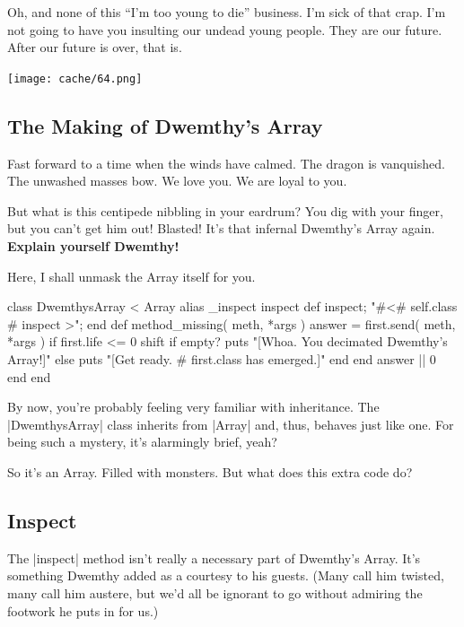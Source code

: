 \documentclass[12pt,twoside]{report}
\begin{document}
Oh, and none of this ``I'm too young to die'' business.  I'm sick of
that crap. I'm not going to have you insulting our undead young
people.  They are our future. After our future is over, that is.

	\texttt{[image: cache/64.png]}



\subsection{The Making of Dwemthy's Array}



Fast forward to a time when the winds have calmed.  The dragon is
vanquished.  The unwashed masses bow.  We love you. We are loyal to
you.

But what is this centipede nibbling in your eardrum?  You dig with
your finger, but you can't get him out!  Blasted!  It's that infernal
Dwemthy's Array again.  {\bf Explain yourself Dwemthy!}

Here, I shall unmask the Array itself for you.


\begin{rubycode}

 class DwemthysArray < Array
   alias _inspect inspect
   def inspect; "#<#{ self.class }#{ inspect }>"; end
   def method_missing( meth, *args )
     answer = first.send( meth, *args )
     if first.life <= 0
       shift
       if empty?
         puts "[Whoa.  You decimated Dwemthy's Array!]"
       else
         puts "[Get ready. #{ first.class } has emerged.]"
       end
     end
     answer || 0
   end
 end

\end{rubycode}


By now, you're probably feeling very familiar with inheritance.  The
\rubyinline|DwemthysArray| class inherits from
\rubyinline|Array| and, thus, behaves just like one.
For being such a mystery, it's alarmingly brief, yeah?

So it's an Array.  Filled with monsters.  But what does this extra
code do?



\subsection{Inspect}



The \rubyinline|inspect| method isn't really a
necessary part of Dwemthy's Array.  It's something Dwemthy added as a
courtesy to his guests.  (Many call him twisted, many call him
austere, but we'd all be ignorant to go without admiring the footwork
he puts in for us.)
\end{document}
